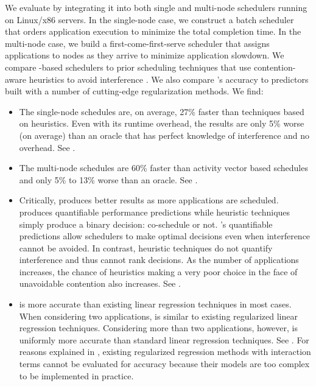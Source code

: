 We evaluate \SYSTEMESP{} by integrating it into both single and
multi-node schedulers running on Linux/x86 servers.  In the
single-node case, we construct a batch scheduler that orders
application execution to minimize the total completion time.  In the
multi-node case, we build a first-come-first-serve scheduler that
assigns applications to nodes as they arrive to minimize application
slowdown.  We compare \SYSTEMESP{}-based schedulers to prior scheduling
techniques that use contention-aware heuristics to avoid interference
\cite{resense,merkel2010resource,Merlin}.  We also compare \SYSTEMESP{}'s
accuracy to predictors built with a number of cutting-edge
regularization methods. We find:
\begin{itemize}
\item The single-node \SYSTEMESP{} schedules are, on average, 27\% faster
  than techniques based on heuristics.  Even with its runtime
  overhead, the \SYSTEMESP{} results are only 5\% worse (on average) than
  an oracle that has perfect knowledge of interference and no
  overhead. See .
\item The multi-node \SYSTEMESP{} schedules are 60\% faster than activity
  vector based schedules and only 5\% to 13\% worse than an oracle.
  See .
\item Critically, \SYSTEMESP{} produces better results as more
  applications are scheduled.  \SYSTEMESP{} produces quantifiable
  performance predictions while heuristic techniques simply produce a
  binary decision: co-schedule or not.  \SYSTEMESP{}'s quantifiable
  predictions allow schedulers to make optimal decisions even when
  interference cannot be avoided. In contrast, heuristic techniques do
  not quantify interference and thus cannot rank decisions.  As the
  number of applications increases, the chance of heuristics making a
  very poor choice in the face of unavoidable contention also
  increases.  See .
\item \SYSTEMESP{} is more accurate than existing linear regression
  techniques in most cases.  When considering two applications,
  \SYSTEMESP{} is similar to existing regularized linear regression
  techniques.  Considering more than two applications, however,
  \SYSTEMESP{} is uniformly more accurate than standard linear regression
  techniques.  See .  For reasons explained in
  , existing regularized regression methods with
  interaction terms cannot be evaluated for accuracy because their
  models are too complex to be implemented in practice.
\end{itemize}

